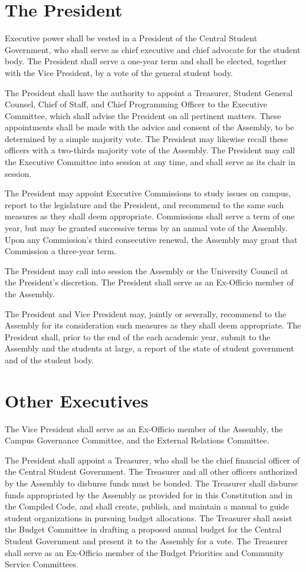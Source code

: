 \section{The President}
    Executive power shall be vested in a President of the Central Student Government, who shall serve as chief executive and chief advocate for the student body. The President shall serve a one-year term and shall be elected, together with the Vice President, by a vote of the general student body.

    The President shall have the authority to appoint a Treasurer, Student General Counsel, Chief of Staff, and Chief Programming Officer to the Executive Committee, which shall advise the President on all pertinent matters. These appointments shall be made with the advice and consent of the Assembly, to be determined by a simple majority vote. The President may likewise recall these officers with a two-thirds majority vote of the Assembly. The President may call the Executive Committee into session at any time, and shall serve as its chair in session.

    The President may appoint Executive Commissions to study issues on campus, report to the legislature and the President, and recommend to the same such measures as they shall deem appropriate. Commissions shall serve a term of one year, but may be granted successive terms by an annual vote of the Assembly. Upon any Commission's third consecutive renewal, the Assembly may grant that Commission a three-year term. 

    The President may call into session the Assembly or the University Council at the President's discretion. The President shall serve as an Ex-Officio member of the Assembly.

    The President and Vice President may, jointly or severally, recommend to the Assembly for its consideration such measures as they shall deem appropriate. The President shall, prior to the end of the each academic year, submit to the Assembly and the students at large, a report of the state of student government and of the student body.

\section{Other Executives}
    The Vice President shall serve as an Ex-Officio member of the Assembly, the Campus Governance Committee, and the External Relations Committee.

   The President shall appoint a Treasurer, who shall be the chief financial officer of the Central Student Government. The Treasurer and all other officers authorized by the Assembly to disburse funds must be bonded. The Treasurer shall disburse funds appropriated by the Assembly as provided for in this Constitution and in the Compiled Code, and shall create, publish, and maintain a manual to guide student organizations in pursuing budget allocations. The Treasurer shall assist the Budget Committee in drafting a proposed annual budget for the Central Student Government and present it to the Assembly for a vote. The Treasurer shall serve as an Ex-Officio member of the Budget Priorities and Community Service Committees.

